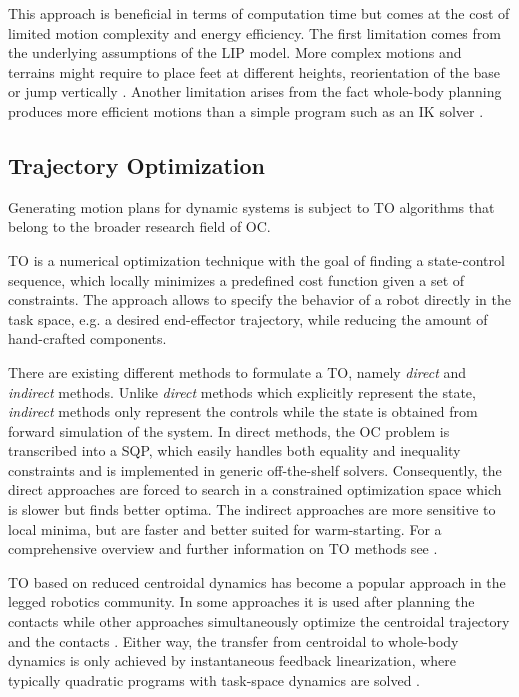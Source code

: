 This approach is beneficial in terms of computation time but comes at the cost of limited motion complexity and energy efficiency. 
The first limitation comes from the underlying assumptions of the \gls{LIP} model. More complex motions and terrains might require to place feet at different heights, reorientation of the base or jump vertically \cite{winkler2018optimization}. Another limitation arises from the fact whole-body planning produces more efficient motions than a simple program such as an \gls{IK} solver \cite{budhiraja2018differential}.   

\subsection{Trajectory Optimization}
Generating motion plans for dynamic systems is subject to \gls{TO} algorithms that belong to the broader research field of \gls{OC}. 

\gls{TO} is a numerical optimization technique with the goal of finding a state-control sequence, which locally minimizes a predefined cost function given a set of constraints. The approach allows to specify the behavior of a robot directly in the task space, e.g. a desired end-effector trajectory, while reducing the amount of hand-crafted components. 

There are existing different methods to formulate a \gls{TO}, namely \textit{direct} and \textit{indirect} methods. Unlike \textit{direct} methods which explicitly represent the state, \textit{indirect} methods only represent the controls while the state is obtained from forward simulation of the system. In direct methods, the \gls{OC} problem is transcribed into a \gls{SQP}, which easily handles both equality and inequality constraints and is implemented in generic off-the-shelf solvers. Consequently, the direct approaches are forced to search in a constrained optimization space which is slower but finds better optima. The indirect approaches are more sensitive to local minima, but are faster and better suited for warm-starting. For a comprehensive overview and further information on \gls{TO} methods see \cite{betts1998survey, kelly2017transcription, tassa2014control}.

\gls{TO} based on reduced centroidal dynamics \cite{orin2013centroidal} has become a popular approach in the legged robotics community. In some approaches it is used after planning the contacts \cite{dai2014whole, carpentier2016versatile, herzog2015trajectory} while other approaches simultaneously optimize the centroidal trajectory and the contacts \cite{mastalli2017trajectory, winkler2018gait, aceituno2017simultaneous}. Either way, the transfer from centroidal to whole-body dynamics is only achieved by instantaneous feedback linearization, where typically quadratic programs with task-space dynamics are solved \cite{saab2013dynamic, herzog2016momentum, vaillant2016multi}. 

